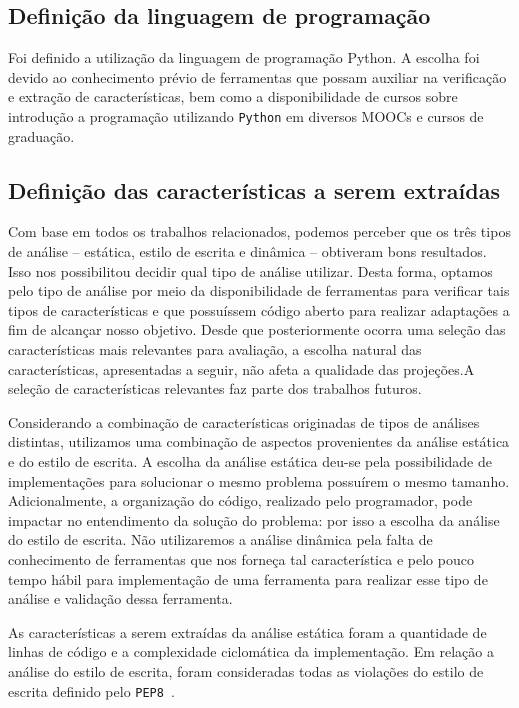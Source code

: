 		\subsection{Definição da linguagem de programação}
		
			Foi definido a utilização da linguagem de programação Python. A escolha foi
			devido ao conhecimento prévio de ferramentas que possam auxiliar na verificação
			e extração de características, bem como a disponibilidade de cursos sobre
			introdução a programação utilizando \texttt{Python} em diversos \acs{MOOC}s
			e cursos de graduação.

		\subsection{Definição das características a serem extraídas}

			Com base em todos os trabalhos relacionados, podemos perceber que os três
			tipos de análise -- estática, estilo de escrita e dinâmica -- obtiveram
			bons resultados. Isso nos possibilitou decidir qual tipo de análise
			utilizar. Desta forma, optamos pelo tipo de análise por meio da disponibilidade
			de ferramentas para verificar tais tipos de características e que possuíssem
			código aberto para realizar adaptações a fim de alcançar nosso objetivo.
			Desde que posteriormente ocorra uma seleção das características mais relevantes
			para avaliação, a escolha natural das características, apresentadas a seguir,
			não	afeta a qualidade das projeções.A seleção de características relevantes
			faz parte dos trabalhos futuros.

			Considerando a combinação de características originadas de tipos de análises
			distintas, utilizamos uma combinação de aspectos provenientes da análise  
			estática e do estilo de escrita. A escolha da análise estática deu-se pela
			possibilidade de implementações para solucionar o mesmo problema possuírem
			o mesmo tamanho. Adicionalmente, a organização do código, realizado pelo programador,
			pode impactar no entendimento da solução do problema: por isso a escolha da
			análise do estilo de escrita.  Não utilizaremos a análise dinâmica pela falta
			de conhecimento de ferramentas que nos forneça tal característica e pelo pouco
			tempo hábil para implementação de uma ferramenta para realizar esse tipo de
			análise e validação dessa ferramenta.
			
			As características a serem extraídas da análise estática foram a quantidade
			de linhas de código e a complexidade ciclomática da implementação. Em relação
			a análise do estilo de escrita, foram consideradas todas as violações do estilo de
			escrita definido pelo \texttt{PEP8}~\cite{van2001pep}. 

